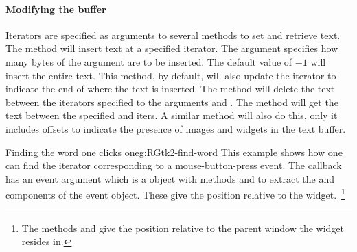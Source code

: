\paragraph{Modifying the buffer}
Iterators are specified as arguments to several methods to set and
retrieve text. The  method will insert
text at a specified iterator. The argument
 specifies how many bytes of the
 argument are to be inserted. The default value of $-1$
will insert the entire text. This
method, by default, will also update the iterator to indicate the end
of where the text is inserted. The 
method will delete the text between the iterators specified to the
arguments  and
. The
 method will get the text between the
specified  and
 iters. A similar method
 will also do this, only it includes
offsets to indicate the presence of images and widgets in the text
buffer.

\begin{example}{Finding the word one clicks on}{eg:RGtk2-find-word}
  This example shows how one can find the iterator corresponding to a
  mouse-button-press event. The callback has an event argument which is
  a  object with methods
   and  to
  extract the  and  components of the event
  object. These give the position relative to the widget.~\footnote{The methods
     and
     give the position relative to the
    parent window the widget resides in.}


\begin{Schunk}
\end{Schunk}
\end{example}


